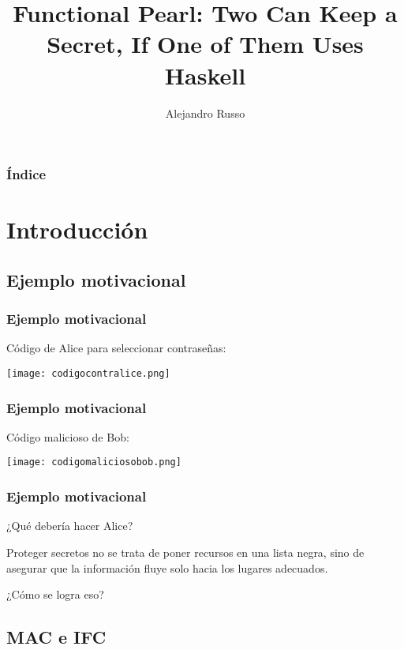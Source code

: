 \documentclass{beamer}
\title{Functional Pearl: \newline Two Can Keep a Secret, If One of Them Uses Haskell}
\subtitle{}
\author{Alejandro Russo}
\institute{Katherine Sullivan \newline FCEIA - UNR}
\date{}
\begin{document}
\begin{frame}
    \titlepage
\end{frame}


\begin{frame}
    \frametitle{Índice}
    \tableofcontents
\end{frame}

\section{Introducción}
\subsection{Ejemplo motivacional}

\begin{frame}
\frametitle{Ejemplo motivacional}
    \pause
    Código de Alice para seleccionar contraseñas:
    \pause[3]
    \begin{center}
        \texttt{[image: codigocontralice.png]}
    \end{center}
\end{frame}

\begin{frame}
\frametitle{Ejemplo motivacional}
    \pause
    Código malicioso de Bob:
    \pause[3]
    \begin{center}
        \texttt{[image: codigomaliciosobob.png]}
    \end{center}
\end{frame}

\begin{frame}
\frametitle{Ejemplo motivacional}
    \pause
    ¿Qué debería hacer Alice?
    \pause[3]
    \vspace{0.7cm}
    
    Proteger secretos no se trata de poner recursos en una lista negra, sino de asegurar que la información fluye solo hacia los lugares adecuados.
    \vspace{0.7cm}
    
    \pause[4]
    ¿Cómo se logra eso?
\end{frame}

\subsection{MAC e IFC}
\end{document}
